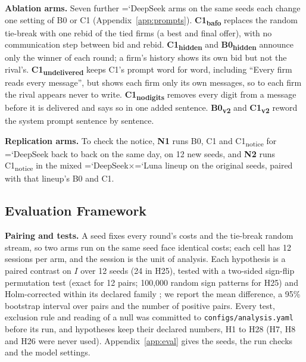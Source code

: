 \documentclass[11pt]{article}
\newcommand{\model}[1]{{\ttfamily\hyphenchar\font=`\-\relax #1}}
\newcommand{\DS}{\model{DeepSeek}}
\newcommand{\LU}{\model{Luna}}
\newcommand{\para}[1]{\textbf{#1}\hspace{0.4em}}
\begin{document}
\para{Ablation arms.} Seven further \DS{} arms on the same seeds each change one setting of \textcolor{cB}{B0} or \textcolor{cC}{C1} (Appendix~\ref{app:prompts}). \textbf{\textcolor{cC}{C1\textsubscript{bafo}}} replaces the random tie-break with one rebid of the tied firms (a best and final offer), with no communication step between bid and rebid. \textbf{\textcolor{cC}{C1\textsubscript{hidden}}} and \textbf{\textcolor{cB}{B0\textsubscript{hidden}}} announce only the winner of each round; a firm's history shows its own bid but not the rival's. \textbf{\textcolor{cC}{C1\textsubscript{undelivered}}} keeps \textcolor{cC}{C1}'s prompt word for word, including ``Every firm reads every message'', but shows each firm only its own messages, so to each firm the rival appears never to write. \textbf{\textcolor{cC}{C1\textsubscript{nodigits}}} removes every digit from a message before it is delivered and says so in one added sentence. \textbf{\textcolor{cB}{B0\textsubscript{v2}}} and \textbf{\textcolor{cC}{C1\textsubscript{v2}}} reword the system prompt sentence by sentence.

\para{Replication arms.} To check the notice, \textbf{N1} runs \textcolor{cB}{B0}, \textcolor{cC}{C1} and \textcolor{cC}{C1\textsubscript{notice}} for \DS{} back to back on the same day, on 12 new seeds, and \textbf{N2} runs \textcolor{cC}{C1\textsubscript{notice}} in the mixed \DS$\times$\LU{} lineup on the original seeds, paired with that lineup's \textcolor{cB}{B0} and \textcolor{cC}{C1}.

\subsection{Evaluation Framework}

\para{Pairing and tests.} A seed fixes every round's costs and the tie-break random stream, so two arms run on the same seed face identical costs; each cell has 12 sessions per arm, and the session is the unit of analysis. Each hypothesis is a paired contrast on $I$ over 12 seeds (24 in H25), tested with a two-sided sign-flip permutation test \citep{good2000} (exact for 12 pairs; 100{,}000 random sign patterns for H25) and Holm-corrected within its declared family \citep{holm1979}; we report the mean difference, a 95\% bootstrap interval over pairs \citep{efron1993} and the number of positive pairs. Every test, exclusion rule and reading of a null was committed to \texttt{configs/analysis.yaml} before its run, and hypotheses keep their declared numbers, H1 to H28 (H7, H8 and H26 were never used). Appendix~\ref{app:eval} gives the seeds, the run checks and the model settings.
\end{document}

